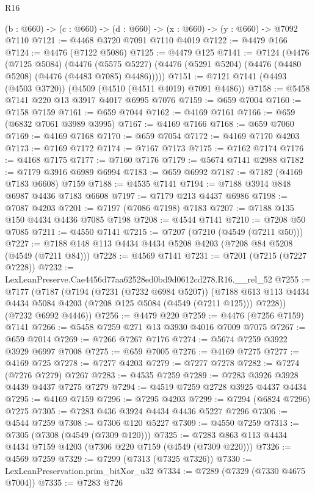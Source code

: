 \begin{lexlean}{R16}
\begin{coremodule}
  (b : @660) -> (c : @660) -> (d : @660) -> (x : @660) -> (y : @660) -> @7092 @7110
@7121 := @4468 @3720 @7091 @7110 @4019
@7122 := @4479 @166
@7124 := @4476 (@7122 @5086)
@7125 := @4479 @125
@7141 := @7124
    (@4476
      (@7125 @5084)
      (@4476 (@5575 @5227) (@4476 (@5291 @5204) (@4476 (@4480 @5208) (@4476 (@4483 @7085) @4486)))))
@7151 := @7121 @7141 (@4493 (@4503 @3720)) (@4509 (@4510 (@4511 @4019) @7091 @4486))
@7158 := @5458 @7141 @220 @13 @3917 @4017 @6995 @7076
@7159 := @659 @7004
@7160 := @7158 @7159
@7161 := @659 @7044
@7162 := @4169 @7161
@7166 := @659 (@6832 @7061 @3989 @3995)
@7167 := @4169 @7166
@7168 := @659 @7060
@7169 := @4169 @7168
@7170 := @659 @7054
@7172 := @4169 @7170 @4203
@7173 := @7169 @7172
@7174 := @7167 @7173
@7175 := @7162 @7174
@7176 := @4168 @7175
@7177 := @7160 @7176
@7179 := @5674 @7141 @2988
@7182 := @7179 @3916 @6989 @6994
@7183 := @659 @6992
@7187 := @7182 (@4169 @7183 @6608) @7159
@7188 := @4535 @7141
@7194 := @7188 @3914 @848 @6987 @4436 @7183 @6608
@7197 := @7179 @213 @4437 @6986
@7198 := @7087 @4203
@7201 := @7197 (@7086 @7198) @7183
@7207 := @7188 @135 @150 @4434 @4436 @7085 @7198
@7208 := @4544 @7141
@7210 := @7208 @50 @7085
@7211 := @4550 @7141
@7215 := @7207 (@7210 (@4549 (@7211 @50)))
@7227 := @7188 @148 @113 @4434 @4434 @5208 @4203 (@7208 @84 @5208 (@4549 (@7211 @84)))
@7228 := @4569 @7141
@7231 := @7201 (@7215 (@7227 @7228))
@7232 := LexLeanPreserve.Cae4456d77aa62528ed0bd9d0612cd278.R16.__rel_52
@7255 := @7177
    (@7187
      (@7194
        (@7231 (@7232 @6984 @5207))
        (@7188 @613 @113 @4434 @4434 @5084 @4203 (@7208 @125 @5084 (@4549 (@7211 @125))) @7228))
      (@7232 @6992 @4446))
@7256 := @4479 @220
@7259 := @4476 (@7256 @7159) @7141
@7266 := @5458 @7259 @271 @13 @3930 @4016 @7009 @7075
@7267 := @659 @7014
@7269 := @7266 @7267 @7176
@7274 := @5674 @7259 @3922 @3929 @6997 @7008
@7275 := @659 @7005
@7276 := @4169 @7275
@7277 := @4169 @725
@7278 := @7277 @4203
@7279 := @7277 @7278
@7282 := @7274 (@7276 @7279) @7267
@7283 := @4535 @7259
@7289 := @7283 @3926 @3928 @4439 @4437 @7275 @7279
@7294 := @4519 @7259 @2728 @3925 @4437 @4434
@7295 := @4169 @7159
@7296 := @7295 @4203
@7299 := @7294 (@6824 @7296) @7275
@7305 := @7283 @436 @3924 @4434 @4436 @5227 @7296
@7306 := @4544 @7259
@7308 := @7306 @120 @5227
@7309 := @4550 @7259
@7313 := @7305 (@7308 (@4549 (@7309 @120)))
@7325 := @7283 @863 @113 @4434 @4434 @7159 @4203 (@7306 @220 @7159 (@4549 (@7309 @220)))
@7326 := @4569 @7259
@7329 := @7299 (@7313 (@7325 @7326))
@7330 := LexLeanPreservation.prim_bitXor_u32
@7334 := @7289 (@7329 (@7330 @4675 @7004))
@7335 := @7283 @726

\end{coremodule}
\end{lexlean}
